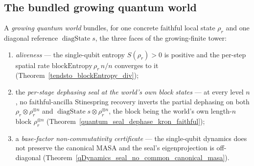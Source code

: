 \subsection{The bundled growing quantum world}

\begin{definition}\label{GrowingQuantumWorld}
  \leanok
  A \emph{growing quantum world} bundles, for one concrete faithful local state \(\rho_r\) and one
  diagonal reference \(\operatorname{diagState} s\), the three faces of the growing-finite tower:
  \begin{enumerate}
    \item \emph{aliveness} --- the single-qubit entropy \(S(\rho_r) > 0\) is positive and the per-step
      spatial rate \(\mathrm{blockEntropy}\,\rho_r\,n / n\) converges to it
      (Theorem~\ref{tendsto_blockEntropy_div});
    \item the \emph{per-stage dephasing seal at the world's own block states} --- at every level \(n\),
      no faithful-ancilla Stinespring recovery inverts the partial dephasing on both
      \(\rho_r\otimes\rho_r^{\otimes n}\) and \(\operatorname{diagState} s\otimes\rho_r^{\otimes n}\),
      the block being the world's own length-\(n\) block \(\rho_r^{\otimes n}\)
      (Theorem~\ref{quantum_seal_dephase_kron_faithful});
    \item a \emph{base-factor non-commutativity certificate} --- the single-qubit dynamics does not
      preserve the canonical MASA and the seal's eigenprojection is off-diagonal
      (Theorem~\ref{qDynamics_seal_no_common_canonical_masa}).
  \end{enumerate}
\end{definition}

